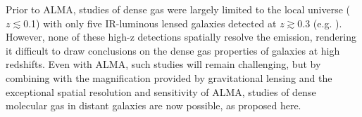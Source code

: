 \documentclass[12pt,a4paper]{article}  %
\newcommand{\rarr}{$\rightarrow$}
\newcommand{\bco}{\mbox{CO($J$=2\rarr1)}\xspace}
\newcommand{\Fig}[1]{Fig.~\ref{fig:#1}}
\begin{document}
Prior to ALMA, studies of dense gas were largely limited to the local universe ($z\lesssim$0.1) 
with only five IR-luminous lensed galaxies detected at $z\gtrsim0.3$ 
(e.g. \citealt{Riechers06a, Riechers07a, Riechers10a, Wagg05a, Gao07a}).
However, none of these high-z detections spatially resolve the emission, rendering it difficult 
to draw conclusions on the dense gas properties of galaxies at high redshifts. 
Even with ALMA, such studies will remain challenging, but by combining with
the magnification provided by gravitational lensing and the exceptional spatial resolution and sensitivity of ALMA, studies
of dense molecular gas in distant galaxies are now possible, as proposed here.


\end{document}
